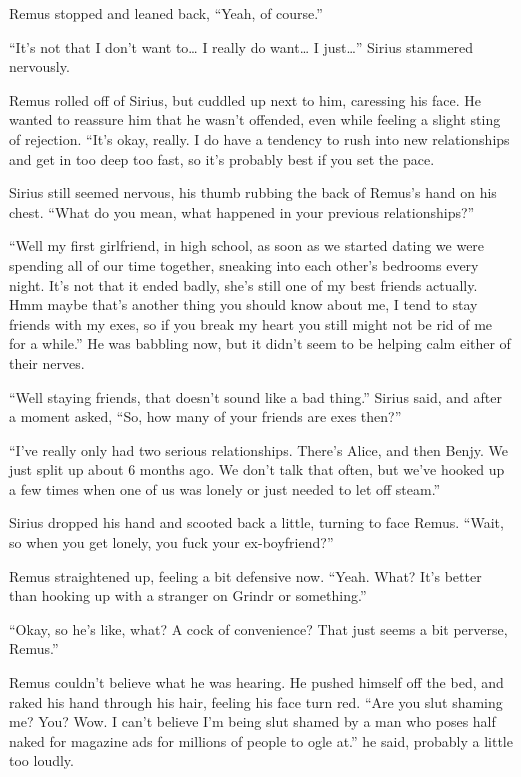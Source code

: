 \documentclass[12pt,twoside,openright]{memoir}
\begin{document}
Remus stopped and leaned back, ``Yeah, of course.''

``It's not that I don't want to… I really do want… I just…'' Sirius stammered nervously.

Remus rolled off of Sirius, but cuddled up next to him, caressing his face. He wanted to reassure him that he wasn't offended, even while feeling a slight sting of rejection. ``It's okay, really. I do have a tendency to rush into new relationships and get in too deep too fast, so it's probably best if you set the pace.{\textquotedbl}

Sirius still seemed nervous, his thumb rubbing the back of Remus's hand on his chest. ``What do you mean, what happened in your previous relationships?''

``Well my first girlfriend, in high school, as soon as we started dating we were spending all of our time together, sneaking into each other's bedrooms every night. It's not that it ended badly, she's still one of my best friends actually. Hmm maybe that's another thing you should know about me, I tend to stay friends with my exes, so if you break my heart you still might not be rid of me for a while.'' He was babbling now, but it didn't seem to be helping calm either of their nerves. 

``Well staying friends, that doesn't sound like a bad thing.'' Sirius said, and after a moment asked, ``So, how many of your friends are exes then?''

``I've really only had two serious relationships. There's Alice, and then Benjy. We just split up about 6 months ago. We don't talk that often, but we've hooked up a few times when one of us was lonely or just needed to let off steam.''

Sirius dropped his hand and scooted back a little, turning to face Remus. ``Wait, so when you get lonely, you fuck your ex-boyfriend?''

Remus straightened up, feeling a bit defensive now. ``Yeah. What? It's better than hooking up with a stranger on Grindr or something.''

``Okay, so he's like, what? A cock of convenience? That just seems a bit perverse, Remus.''

Remus couldn't believe what he was hearing. He pushed himself off the bed, and raked his hand through his hair, feeling his face turn red. ``Are you slut shaming me? You? Wow. I can't believe I'm being slut shamed by a man who poses half naked for magazine ads for millions of people to ogle at.'' he said, probably a little too loudly. 
\end{document}
